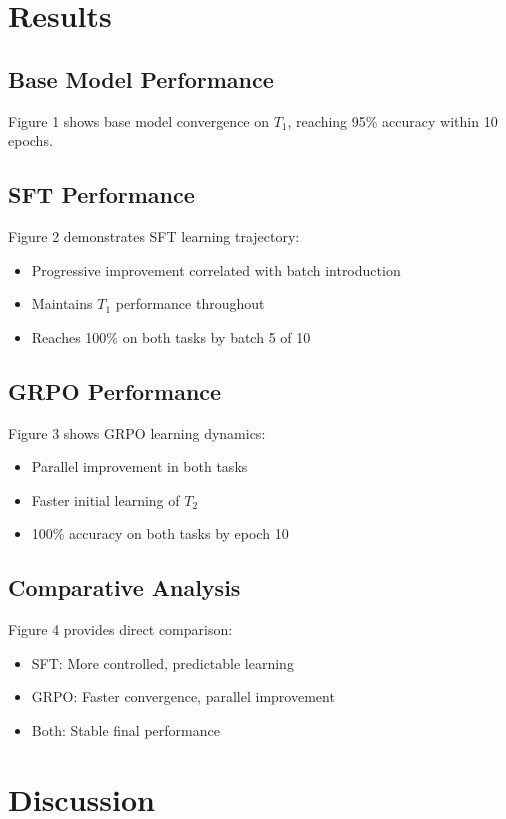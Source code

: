 \documentclass[11pt]{article}
\begin{document}
\section{Results}

\subsection{Base Model Performance}
Figure 1 shows base model convergence on $T_1$, reaching 95\% accuracy within 10 epochs.

\subsection{SFT Performance}
Figure 2 demonstrates SFT learning trajectory:
\begin{itemize}
    \item Progressive improvement correlated with batch introduction
    \item Maintains $T_1$ performance throughout
    \item Reaches 100\% on both tasks by batch 5 of 10
\end{itemize}

\subsection{GRPO Performance}
Figure 3 shows GRPO learning dynamics:
\begin{itemize}
    \item Parallel improvement in both tasks
    \item Faster initial learning of $T_2$
    \item 100\% accuracy on both tasks by epoch 10
\end{itemize}

\subsection{Comparative Analysis}
Figure 4 provides direct comparison:
\begin{itemize}
    \item SFT: More controlled, predictable learning
    \item GRPO: Faster convergence, parallel improvement
    \item Both: Stable final performance
\end{itemize}

\section{Discussion}
\end{document}
